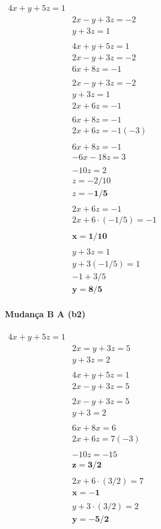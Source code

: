 \documentclass{article}
\begin{document}
$\begin{align}\\
4 x+y+5 z=1\\&
2 x-y+3 z=-2\\&
y+3 z=1\\\\&
4 x+y+5 z=1\\&
2 x-y+3 z=-2\\&
6 x+8 z=-1\\\\&
2 x-y+3 z=-2\\&
y+3 z=1\\&
2 x+6 z=-1\\\\&
6 x+8 z=-1\\&
2 x+6 z=-1(-3)\\\\&
6 x+8 z=-1\\&
-6 x-18 z=3\\\\&
-10 z=2\\&
z=-2 / 10\\&
z=\mathbf{-1/5}\\\\&
2 x+6 z=-1\\&
2 x+6 \cdot(-1 / 5)=-1\\\\&
\mathbf{x=1 / 10}\\\\&
y+3 z=1\\&
y+3(-1 / 5)=1\\&
-1+3 / 5\\&
\mathbf{y=8 / 5}&
\end{align}$
\\\\
\textbf{Mudança B \rightarrow A (b2)}\\\\
$\begin{align}
4 x+y+5 z=1\\&
2 x=y+3 z=5\\&
y+3 z=2\\\\&
4 x+y+5 z=1\\&
2 x-y+3 z=5\\\\&
2 x-y+3 z=5\\&
y+3=2\\\\&
6 x+8 x=6\\&
2 x+6 z=7(-3)\\\\&
-10 z=-15\\&
\mathbf{z=3 / 2}\\\\&
2 x+6 \cdot(3 / 2)=7\\&
\mathbf{x=-1}\\\\&
y+3 \cdot(3 / 2)=2\\&
\mathbf{y=-5 / 2}\\\\\\&
\end{align}$
\end{document}
